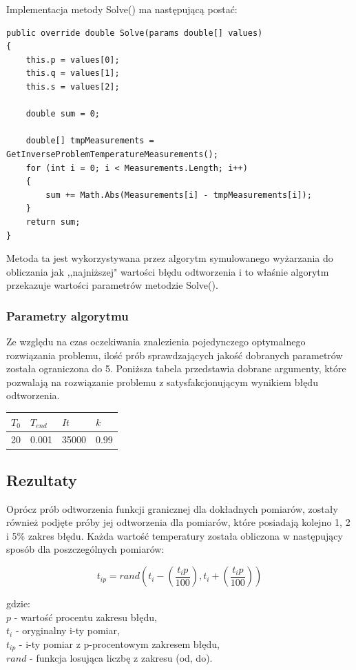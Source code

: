 \documentclass[twoside]{projektInzynierskiMS1}
\newcommand{\si}{ś}
\begin{document}
Implementacja metody Solve() ma następującą postać:

\begin{verbatim}
public override double Solve(params double[] values)
{
    this.p = values[0];
    this.q = values[1];
    this.s = values[2];

    double sum = 0;

    double[] tmpMeasurements = GetInverseProblemTemperatureMeasurements();
    for (int i = 0; i < Measurements.Length; i++)
    {
        sum += Math.Abs(Measurements[i] - tmpMeasurements[i]);
    }
    return sum;
}
\end{verbatim}

Metoda ta jest wykorzystywana przez algorytm symulowanego wyżarzania do obliczania jak ,,najniższej" warto\si ci błędu odtworzenia i to wła\si nie algorytm przekazuje warto\si ci parametrów metodzie Solve().

\subsubsection{Parametry algorytmu}
Ze względu na czas oczekiwania znalezienia pojedynczego optymalnego rozwiązania problemu, ilo\si ć prób sprawdzających jako\si ć dobranych parametrów została ograniczona do 5. Poniższa tabela przedstawia dobrane argumenty, które pozwalają na rozwiązanie problemu z satysfakcjonującym wynikiem błędu odtworzenia. \\

\begin{tabularx}{\textwidth}{ |X|X|X|X|} 
\hline
  $T_0$ &
  $T_{end}$ &
  $It$&
  $k$\\ \hline
20 & 0.001 & 35000 & 0.99 \\ \hline 
\end{tabularx}

\subsection{Rezultaty}

Oprócz prób odtworzenia funkcji granicznej dla dokładnych pomiarów, zostały również podjęte próby jej odtworzenia dla pomiarów, które posiadają kolejno 1, 2 i 5\% zakres błędu. Każda warto\si ć temperatury została obliczona w następujący sposób dla poszczególnych pomiarów:

\[ t_{ip} = rand\left(t_{i} - \left(\frac{t_{i} p}{100}\right), t_{i} +\left (\frac{t_{i} p}{100}\right)\right) \]

gdzie:\\
$p$ - warto\si ć procentu zakresu błędu,\\
$t_i$ - oryginalny i-ty pomiar,\\
$t_{ip}$ - i-ty pomiar z p-procentowym zakresem błędu,\\
$rand$ - funkcja losująca liczbę z zakresu (od, do).
\end{document}
